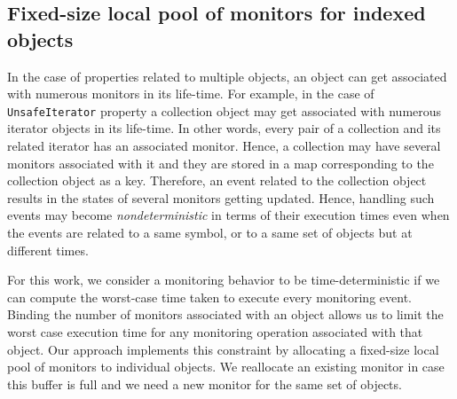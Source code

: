 \subsection{Fixed-size local pool of monitors for indexed objects}

In the case of properties related to multiple objects, 
an object can get associated with numerous monitors in its life-time. For example,
in the case of \texttt{UnsafeIterator} property a collection object may get associated
with numerous iterator objects in its life-time. In other words, every pair of a collection and its related
iterator has an associated monitor. Hence, a collection may have several monitors associated with it
and they are stored in a map corresponding to the collection object as a key.
Therefore, an event related to the collection object results in the states of 
several monitors getting updated. Hence, handling such events may become 
\textit{nondeterministic} in terms of their execution times even when the events are related
to a same symbol, or to a same set of objects but at different times.

For this work, we consider a monitoring behavior to be time-deterministic if we 
can compute the 
worst-case time taken to execute every monitoring event. Binding the number of 
monitors associated with an object allows us to limit the worst case execution 
time for any monitoring operation associated with that object. Our approach 
implements this constraint by allocating a fixed-size local pool of monitors to 
individual objects. We reallocate an existing monitor in case this buffer is full and we need a new
monitor for the same set of objects.



